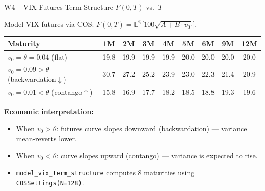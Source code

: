 \documentclass[aspectratio=169, 11pt]{beamer}
\begin{document}
\begin{frame}{W4 -- VIX Futures Term Structure $F(0,T)$ vs.\ $T$}

Model VIX futures via COS:\; $F(0,T)=\mathbb{E}^{\mathbb{Q}}\!\bigl[100\sqrt{A+B\cdot v_T}\bigr]$.

\medskip
\begin{center}\small
\begin{tabular}{lcccccccc}
  \toprule
  Maturity & 1M & 2M & 3M & 4M & 5M & 6M & 9M & 12M \\
  \midrule
  $v_0\!=\!\theta\!=\!0.04$ (flat) & 19.8 & 19.9 & 19.9 & 19.9 & 20.0 & 20.0 & 20.0 & 20.0 \\
  $v_0\!=\!0.09>\theta$ (backwardation$\downarrow$) & 30.7 & 27.2 & 25.2 & 23.9 & 23.0 & 22.3 & 21.4 & 20.9 \\
  $v_0\!=\!0.01<\theta$ (contango$\uparrow$) & 15.8 & 16.9 & 17.7 & 18.2 & 18.5 & 18.8 & 19.3 & 19.6 \\
  \bottomrule
\end{tabular}
\end{center}

\medskip
\textbf{Economic interpretation:}
\begin{itemize}
  \item When $v_0 > \theta$: futures curve slopes downward (backwardation) --- variance mean-reverts lower.
  \item When $v_0 < \theta$: curve slopes upward (contango) --- variance is expected to rise.
  \item \texttt{model\_vix\_term\_structure} computes 8 maturities using \texttt{COSSettings(N=128)}.
\end{itemize}
\end{frame}
\end{document}
